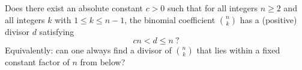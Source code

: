 Does there exist an absolute constant $c>0$ such that for all integers $n\ge 2$ and all integers $k$ with $1\le k\le n-1$, the binomial coefficient $\binom{n}{k}$ has a (positive) divisor $d$ satisfying
\[
cn<d\le n\ ?
\]
Equivalently: can one always find a divisor of $\binom{n}{k}$ that lies within a fixed constant factor of $n$ from below?
